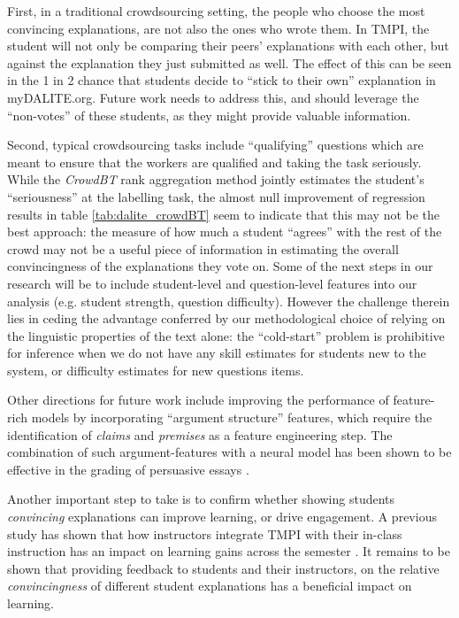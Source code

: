 \documentclass[notitlepage,12pt]{jedm}
\begin{document}
First, in a traditional crowdsourcing setting, the people who choose the most 
convincing explanations, are not also the ones who wrote them.
In TMPI, the student will not only be comparing their peers' explanations with 
each other, but against the explanation they just submitted as well.
The effect of this can be seen in the 1 in 2 chance that students decide to 
``stick to their own'' explanation in myDALITE.org.
Future work needs to address this, and should leverage the ``non-votes'' of 
these students, as they might provide valuable information. 

Second, typical crowdsourcing tasks include ``qualifying'' questions which are 
meant to ensure that the workers are qualified and taking the task seriously.
While the \textit{CrowdBT} rank aggregation method jointly estimates the 
student's ``seriousness'' at the labelling task, the almost null improvement of 
regression results in table \ref{tab:dalite_crowdBT} seem to indicate that this 
may not be the best approach: the measure of how much a student ``agrees'' with 
the rest of the crowd may not be a useful piece of information in estimating 
the overall convincingness  of the explanations they vote on.
Some of the next steps in our research will be to include student-level and 
question-level features into our analysis (e.g. student strength, question 
difficulty).
However the challenge therein lies in ceding the advantage conferred by our 
methodological choice of relying on the linguistic properties of the text 
alone: the ``cold-start'' problem is prohibitive for inference when we do 
not have any skill estimates for students new to the system, or difficulty 
estimates for new questions items.

Other directions for future work include improving the performance of 
feature-rich models by incorporating ``argument structure'' features, which 
require the identification of \textit{claims} and \textit{premises} as a 
feature engineering step.
The combination of such argument-features with a neural model has been shown to 
be effective in the grading of persuasive essays \cite{nguyen_argument_2018}.

Another important step to take is to confirm whether showing students 
\textit{convincing} explanations can improve learning, or drive engagement. 
A previous study has shown that how instructors integrate TMPI with their 
in-class instruction has an impact on learning gains across the semester 
\cite{bhatnagar_analysis_2015}. 
It remains to be shown that providing feedback to students and their 
instructors, on the relative \textit{convincingness} of different student 
explanations has a beneficial impact on learning.
\end{document}
